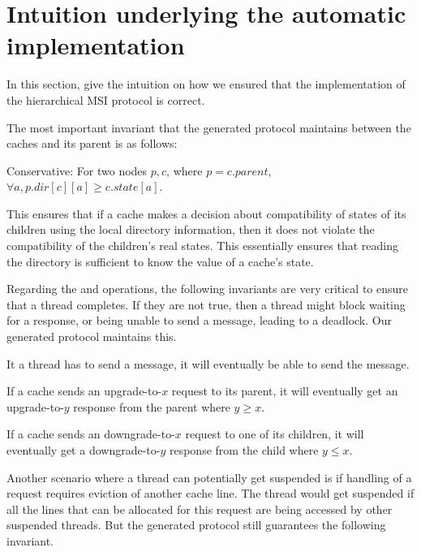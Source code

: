 \section{Intuition underlying the automatic implementation}
\label{sec:properties}

In this section, give the intuition on how we ensured that the implementation of
the hierarchical MSI protocol is correct.

The most important invariant that the generated protocol maintains between the
caches and its parent is as follows:
\begin{theorem}
Conservative: For two nodes $p, c$, where $p = c.parent$, $\forall a,
p.dir[c][a] \ge c.state[a]$.  \label{conservative}
\end{theorem}

This ensures that if a cache makes a decision about compatibility of states of
its children using the local directory information, then it does not violate the
compatibility of the children's real states. This essentially ensures that
reading the directory is sufficient to know the value of a cache's state.

Regarding the \send{} and \receive{} operations, the following
invariants are very critical to ensure that a thread completes. If they are not
true, then a thread might block waiting for a response, or being unable to send a
message, leading to a deadlock. Our generated protocol maintains this.

\begin{theorem}
It a thread has to send a message, it will eventually be able to send the
message.
\label{canSend}
\end{theorem}

\begin{theorem}
If a cache sends an upgrade-to-$x$ request to its parent, it will eventually
get an upgrade-to-$y$ response from the parent where $y \ge x$.
\label{willRecv}
\end{theorem}

\begin{theorem}
If a cache sends an downgrade-to-$x$ request to one of its children, it will
eventually get a downgrade-to-$y$ response from the child where $y \le x$.
\label{willRecv2}
\end{theorem}

Another scenario where a thread can potentially get suspended is if handling of
a request requires eviction of another cache line. The thread would get
suspended if all the lines that can be allocated for this request are being 
accessed by other suspended threads. But the generated protocol still guarantees
the following invariant.

